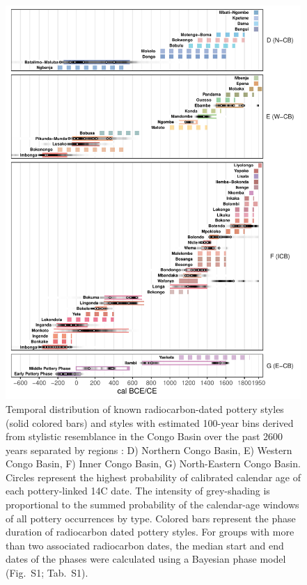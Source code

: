\documentclass[smallextended,natbib]{svjour3}       %
\begin{document}
\begin{figure}[!tbp]
\centering
\includegraphics[width=\textwidth]{fig_chronology.pdf}
\caption{
	Temporal distribution of known radiocarbon-dated pottery styles (solid colored bars) and styles with estimated 100-year bins derived from stylistic resemblance \citep[dashed bars;][Data S2]{Seidensticker.2021} in the Congo Basin over the past 2600 years separated by regions \citep[Fig. 1]{Seidensticker.2021}: D) Northern Congo Basin, E) Western Congo Basin, F) Inner Congo Basin, G) North-Eastern Congo Basin. Circles represent the highest probability of calibrated calendar age of each pottery-linked 14C date. The intensity of grey-shading is proportional to the summed probability of the calendar-age windows of all pottery occurrences by type. Colored bars represent the phase duration of radiocarbon dated pottery styles. For groups with more than two associated radiocarbon dates, the median start and end dates of the phases were calculated using a Bayesian phase model (Fig.~S1; Tab.~S1).}
\label{fig:chrono}
\end{figure}
\end{document}
